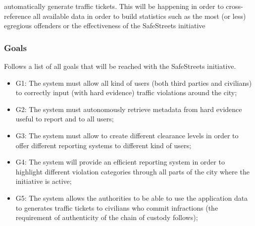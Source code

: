 \documentclass{article}
\begin{document}
    automatically generate traffic tickets. This will be happening in order to
    cross-reference all available data in order to build statistics such as the
    most (or less) egregious offenders or the effectiveness of the SafeStreets
    initiative \subsubsection{Goals} Follows a list of all goals that will be
    reached with the SafeStreets initiative.
    \begin{itemize}
        \item G1: The system must allow all kind of users (both third parties
        and civilians) to correctly input (with hard evidence) traffic
        violations around the city;
        \item G2: The system must autonomously retrieve metadata from hard
        evidence useful to report and to all users;
        \item G3: The system must allow to create different clearance levels in
        order to offer different reporting systems to different kind of users;
        \item G4: The system will provide an efficient reporting system in order
        to highlight different violation categories through all parts of the
        city where the initiative is active;
        \item G5: The system allows the authorities to be able to use the 
        application data to generates traffic tickets to civilians who commit 
        infractions (the requirement of authenticity of the chain of custody 
        follows);
    \end{itemize}
\end{document}
